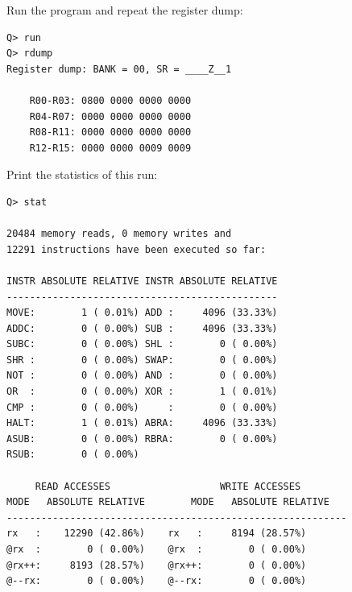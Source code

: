 \documentclass{beamer}
\begin{document}
%
  \begin{frame}[containsverbatim]
   \begin{description}
    \item [Run the program and repeat the register dump:]
   \end{description}
   \begin{verbatim}
Q> run 
Q> rdump
Register dump: BANK = 00, SR = ____Z__1

    R00-R03: 0800 0000 0000 0000 
    R04-R07: 0000 0000 0000 0000 
    R08-R11: 0000 0000 0000 0000 
    R12-R15: 0000 0000 0009 0009 
   \end{verbatim}
  \end{frame}
%
  \begin{frame}[containsverbatim]
   \begin{description}
    \item [Print the statistics of this run:]
   \end{description}
   {\tiny
    \begin{verbatim}
Q> stat

20484 memory reads, 0 memory writes and
12291 instructions have been executed so far:

INSTR ABSOLUTE RELATIVE INSTR ABSOLUTE RELATIVE
-----------------------------------------------
MOVE:        1 ( 0.01%) ADD :     4096 (33.33%) 
ADDC:        0 ( 0.00%) SUB :     4096 (33.33%) 
SUBC:        0 ( 0.00%) SHL :        0 ( 0.00%) 
SHR :        0 ( 0.00%) SWAP:        0 ( 0.00%) 
NOT :        0 ( 0.00%) AND :        0 ( 0.00%) 
OR  :        0 ( 0.00%) XOR :        1 ( 0.01%) 
CMP :        0 ( 0.00%)     :        0 ( 0.00%) 
HALT:        1 ( 0.01%) ABRA:     4096 (33.33%) 
ASUB:        0 ( 0.00%) RBRA:        0 ( 0.00%) 
RSUB:        0 ( 0.00%) 

     READ ACCESSES                   WRITE ACCESSES
MODE   ABSOLUTE RELATIVE        MODE   ABSOLUTE RELATIVE
-----------------------------------------------------------
rx   :    12290 (42.86%)    rx   :     8194 (28.57%)
@rx  :        0 ( 0.00%)    @rx  :        0 ( 0.00%)
@rx++:     8193 (28.57%)    @rx++:        0 ( 0.00%)
@--rx:        0 ( 0.00%)    @--rx:        0 ( 0.00%)
    \end{verbatim}
   }
  \end{frame}
%
\end{document}
